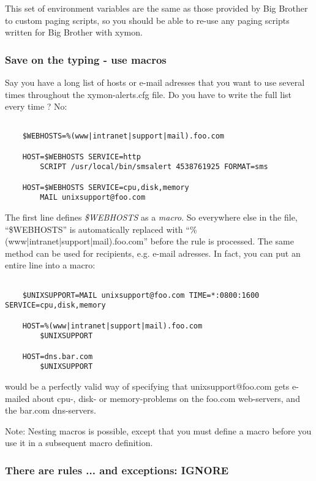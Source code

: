  This set of environment variables are the same as those provided by Big Brother to custom paging scripts, so you should be able to re-use any paging scripts written for Big Brother with xymon.
\subsubsection{Save on the typing - use macros}


 Say you have a long list of hosts or e-mail adresses that you want to use several times throughout the xymon-alerts.cfg file. Do you have to write the full list every time ? No: 
\begin{verbatim}

	$WEBHOSTS=%(www|intranet|support|mail).foo.com 
	
	HOST=$WEBHOSTS SERVICE=http
		SCRIPT /usr/local/bin/smsalert 4538761925 FORMAT=sms

	HOST=$WEBHOSTS SERVICE=cpu,disk,memory
		MAIL unixsupport@foo.com

\end{verbatim}

 The first line defines \emph{\$WEBHOSTS} as a \emph{macro}. So everywhere else in the file, ``\$WEBHOSTS'' is automatically replaced with ``\%(www|intranet|support|mail).foo.com'' before the rule is processed. The same method can be used for recipients, e.g. e-mail adresses. In fact, you can put an entire line into a macro:

\begin{verbatim}

	$UNIXSUPPORT=MAIL unixsupport@foo.com TIME=*:0800:1600 SERVICE=cpu,disk,memory

	HOST=%(www|intranet|support|mail).foo.com 
		$UNIXSUPPORT

	HOST=dns.bar.com
		$UNIXSUPPORT

\end{verbatim}



 would be a perfectly valid way of specifying that unixsupport@foo.com gets e-mailed about cpu-, disk- or memory-problems on the foo.com web-servers, and the bar.com dns-servers.


 Note: Nesting macros is possible, except that you must define a macro before you use it in a subsequent macro definition.
\subsubsection{There are rules ... and exceptions: IGNORE}


